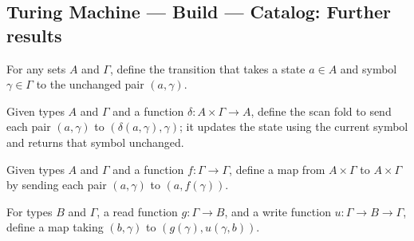 \subsection*{Turing Machine --- Build --- Catalog: Further results}

\begin{definition}
\label{Turing.scanKeep}
\leanok
For any sets $A$ and $\Gamma$, define the transition that takes a state $a\in A$ and
symbol $\gamma\in\Gamma$ to the unchanged pair $(a,\gamma)$.
\end{definition}

\begin{definition}
\label{Turing.scanFold}
\leanok
Given types $A$ and $\Gamma$ and a function $\delta : A \times \Gamma \to A$, define the
scan fold to send each pair $(a,\gamma)$ to $(\delta(a,\gamma),\gamma)$; it updates the
state using the current symbol and returns that symbol unchanged.
\end{definition}

\begin{definition}
\label{Turing.scanMap}
\leanok
Given types $A$ and $\Gamma$ and a function $f : \Gamma \to \Gamma$, define a map from
$A \times \Gamma$ to $A \times \Gamma$ by sending each pair $(a,\gamma)$ to
$(a,f(\gamma))$.
\end{definition}

\begin{definition}
\label{Turing.scanShift}
\leanok
For types $B$ and $\Gamma$, a read function $g : \Gamma \to B$, and a write function $u
: \Gamma \to B \to \Gamma$, define a map taking $(b,\gamma)$ to
$(g(\gamma),u(\gamma,b))$.
\end{definition}
